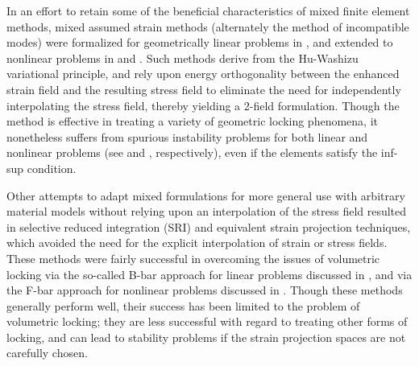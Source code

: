 		In an effort to retain some of the beneficial characteristics of mixed finite element methods, mixed assumed strain methods (alternately the method of incompatible modes) were formalized for geometrically linear problems in \cite{Simo&Rifai:90}, and extended to nonlinear problems in \cite{Simo&Armero:92} and \cite{Simo&Armero&Taylor:93}. Such methods derive from the Hu-Washizu variational principle, and rely upon energy orthogonality between the enhanced strain field and the resulting stress field to eliminate the need for independently interpolating the stress field, thereby yielding a 2-field formulation. Though the method is effective in treating a variety of geometric locking phenomena, it nonetheless suffers from spurious instability problems for both linear and nonlinear problems (see \cite{Bathe&Sussman:14} and \cite{Bathe&Pantuso:97}, respectively), even if the elements satisfy the inf-sup condition.
			
		Other attempts to adapt mixed formulations for more general use with arbitrary material models without relying upon an interpolation of the stress field resulted in selective reduced integration (SRI) and equivalent strain projection techniques, which avoided the need for the explicit interpolation of strain or stress fields. These methods were fairly successful in overcoming the issues of volumetric locking via the so-called B-bar approach for linear problems discussed in \cite{Hughes:00}, and via the F-bar approach for nonlinear problems discussed in \cite{Souza:96}. Though these methods generally perform well, their success has been limited to the problem of volumetric locking; they are less successful with regard to treating other forms of locking, and can lead to stability problems if the strain projection spaces are not carefully chosen.
		
